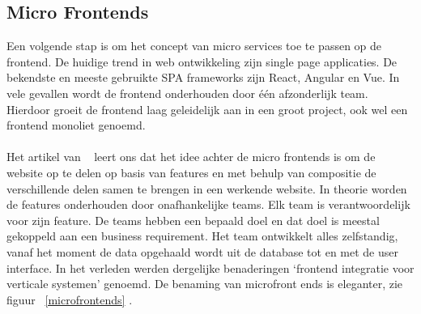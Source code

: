 \subsection{Micro Frontends}
Een volgende stap is om het concept van micro services toe te passen op de frontend. De huidige trend in web ontwikkeling zijn single page applicaties. De bekendste en meeste gebruikte SPA frameworks zijn React, Angular en Vue. In vele gevallen wordt de frontend onderhouden door één afzonderlijk team. Hierdoor groeit de frontend laag geleidelijk aan in een groot project, ook wel een frontend monoliet genoemd.\\\\
Het artikel van ~\autocite{Geers2020} leert ons dat het idee achter de micro frontends is om de website op te delen op basis van features en met behulp van compositie de verschillende delen samen te brengen in een werkende website. In theorie worden de features onderhouden door onafhankelijke teams. Elk team is verantwoordelijk voor zijn feature. De teams hebben een bepaald doel en dat doel is meestal gekoppeld aan een business requirement. Het team ontwikkelt alles zelfstandig, vanaf het moment de data opgehaald wordt uit de database  tot en met de user interface. In het verleden werden dergelijke benaderingen ‘frontend integratie voor verticale systemen’ genoemd. De benaming van microfront ends is eleganter, zie figuur ~\ref{microfrontends} .

